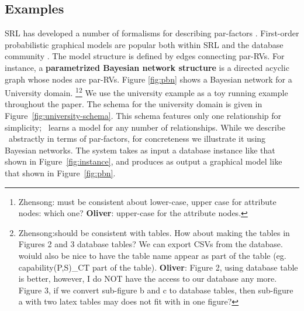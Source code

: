 \subsection{Examples} \label{sec:examples} SRL has developed a number of formalisms for describing par-factors \cite{Kimmig2015}. 
First-order probabilistic graphical models
are popular both within SRL and the database community \cite{Kimmig2015,Wang2008}. The model structure is defined by edges connecting par-RVs. For instance, a \textbf{parametrized Bayesian network structure} is a directed acyclic graph whose nodes are par-RVs.  Figure \ref{fig:pbn} shows a Bayesian network for a University domain. \footnote{Zhensong: must be consistent about lower-case, upper case for attribute nodes: which one? \textbf{Oliver}: upper-case for the attribute nodes.}\footnote{Zhensong:should be consistent with tables. How about making the tables in Figures 2 and 3 database tables? We can export CSVs from the database. woiuld also be nice to have the table name appear as part of the table (eg. capability(P,S)\_CT part of the table). \textbf{Oliver}: Figure 2, using database table is better, however, I do NOT have the access to our database any more. Figure 3, if we convert sub-figure b and c to database tables, then sub-figure a with two latex tables may does not fit with in one figure?}
 We use the university example as a toy running example throughout the paper. The schema for the university domain is given in Figure~\ref{fig:university-schema}. This schema features only one relationship for simplicity; \FB\ learns a model for any number of relationships. While we describe \FB\ abstractly in terms of par-factors, for concreteness we illustrate it using Bayesian networks. The system takes as input a database instance like that shown in Figure~\ref{fig:instance}, and produces as output a graphical model like that shown in Figure~\ref{fig:pbn}.  


